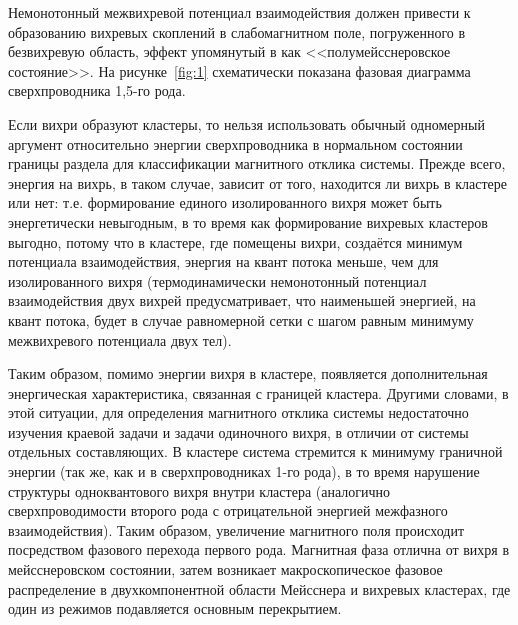 Немонотонный межвихревой потенциал взаимодействия должен привести к 
образованию вихревых скоплений в слабомагнитном поле, погруженного в 
безвихревую область, эффект упомянутый в \cite{bib:1} как 
<<полумейсснеровское состояние>>. На рисунке~\ref{fig:1} схематически 
показана фазовая диаграмма сверхпроводника 1,5-го рода.

Если вихри образуют кластеры, то нельзя использовать обычный одномерный 
аргумент относительно энергии сверхпроводника в нормальном состоянии границы 
раздела для классификации магнитного отклика системы. Прежде всего, энергия 
на вихрь, в таком случае, зависит от того, находится ли вихрь в кластере или 
нет: т.е. формирование единого изолированного вихря может быть энергетически 
невыгодным, в то время как формирование вихревых кластеров выгодно, потому что 
в кластере, где помещены вихри, создаётся минимум потенциала взаимодействия, 
энергия на квант потока меньше, чем для изолированного вихря (термодинамически 
немонотонный потенциал взаимодействия двух вихрей предусматривает, что 
наименьшей энергией, на квант потока, будет в случае равномерной сетки с шагом 
равным минимуму межвихревого потенциала двух тел).

Таким образом, помимо энергии вихря в кластере, появляется дополнительная 
энергическая характеристика, связанная с границей кластера. Другими словами, в 
этой ситуации, для определения магнитного отклика системы недостаточно 
изучения краевой задачи и задачи одиночного вихря, в отличии от системы 
отдельных составляющих. В кластере система стремится к минимуму граничной 
энергии (так же, как и в сверхпроводниках 1-го рода), в то время нарушение 
структуры одноквантового вихря внутри кластера (аналогично сверхпроводимости 
второго рода с отрицательной энергией межфазного взаимодействия). Таким 
образом, увеличение магнитного поля происходит посредством фазового перехода 
первого рода. Магнитная фаза отлична от вихря в мейсснеровском состоянии, затем 
возникает макроскопическое фазовое распределение в двухкомпонентной области 
Мейсснера и вихревых кластерах, где один из режимов подавляется основным 
перекрытием. \cite{bib:main}

\newpage